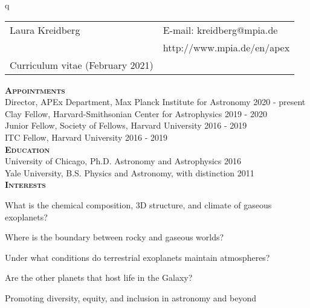 q\documentclass[12pt,letterpaper]{article}
\def\name{Laura R. Kreidberg}
\begin{document}
\sloppy


\begin{tabular}{@{}p{4.0in}@{}p{5.0in}}
    \LARGE{Laura Kreidberg}                  & E-mail: kreidberg@mpia.de\\  
    \,                                       & http://www.mpia.de/en/apex \\ 
    \large{Curriculum vitae} (February 2021) & \, \\
\end{tabular}
\vspace{8mm}

\textbf{\textsc{Appointments}}\\
Director, APEx Department, Max Planck Institute for Astronomy \hfill 2020 - present\\
Clay Fellow, Harvard-Smithsonian Center for Astrophysics \hfill 2019 - 2020\\
Junior Fellow, Society of Fellows, Harvard University \hfill 2016 - 2019\\
ITC Fellow, Harvard University \hfill 2016 - 2019\\

\textbf{\textsc{Education}}\\
University of Chicago, Ph.D. Astronomy and Astrophysics \hfill 2016\\
Yale University, B.S. Physics and Astronomy, with distinction \hfill 2011\\

\textbf{\textsc{Interests}}
\begin{compactitem}
\item What is the chemical composition, 3D structure, and climate of gaseous exoplanets?  
\item Where is the boundary between rocky and gaseous worlds? 
\item Under what conditions do terrestrial exoplanets maintain atmospheres?
\item Are the other planets that host life in the Galaxy? 
\item Promoting diversity, equity, and inclusion in astronomy and beyond
\end{compactitem}
\vspace{6mm}
\end{document}
